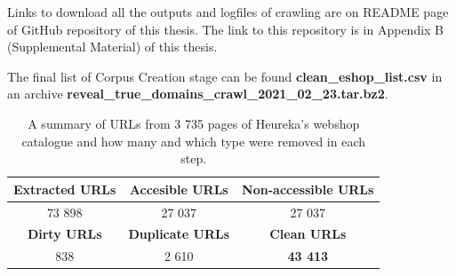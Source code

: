 Links to download all the outputs and logfiles of crawling are on README page of GitHub repository of this thesis. The link to this repository is in Appendix B (Supplemental Material) of this thesis.

The final list of Corpus Creation stage can be found \textbf{clean\_eshop\_list.csv} in an archive \textbf{reveal\_true\_domains\_crawl\_2021\_02\_23.tar.bz2}.

\begin{table}[h!]
    \centering
    \begin{tabular}{ c | c | c } 
        \textbf{Extracted URLs} & \textbf{Accesible URLs} & \textbf{Non-accessible URLs} \\ \hline
      73 898 & 27 037 & 27 037 \\
     \textbf{Dirty URLs} & \textbf{Duplicate URLs} & \textbf{ Clean URLs} \\ \hline
      838 & 2 610 & \textbf{43 413}
    \end{tabular}
    \caption{A summary of URLs from 3 735 pages of Heureka's webshop catalogue and how many and which type were removed in each step.}
    \label{table:summary-corpus-creation}
\end{table}